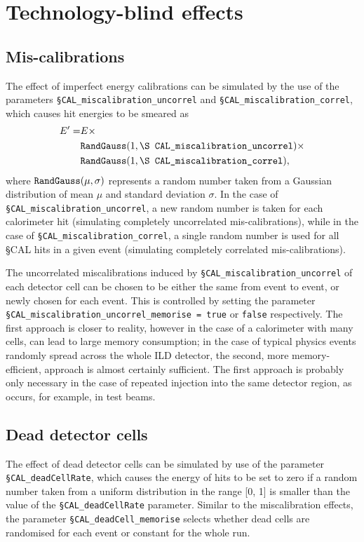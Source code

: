 \documentclass[12pt]{article} %
\begin{document}
\section{Technology-blind effects}
\label{sec:common}

\subsection{Mis-calibrations}
The effect of imperfect energy calibrations can be simulated by the use of the parameters
{\tt \S CAL\_miscalibration\_uncorrel} and {\tt \S CAL\_miscalibration\_correl}, which causes hit energies to
be smeared as 
\begin{equation*}
\begin{split}
E' = & E \times \\
& \text{\tt RandGauss} ( 1, \text{\tt \S CAL\_miscalibration\_uncorrel}) \times \\
& \text{\tt RandGauss} ( 1, \text{\tt \S CAL\_miscalibration\_correl}) ,
\end{split}
\end{equation*}
where $\text{\tt RandGauss} (\mu, \sigma)$ represents a random number taken from a Gaussian distribution of mean $\mu$ and 
standard deviation $\sigma$. In the case of {\tt \S CAL\_miscalibration\_uncorrel}, a new random number is taken for each 
calorimeter hit (simulating completely uncorrelated mis-calibrations), 
while in the case of {\tt \S CAL\_miscalibration\_correl}, a single random number is used for all \S CAL 
hits in a given event (simulating completely correlated mis-calibrations).

The uncorrelated miscalibrations induced by {\tt \S CAL\_miscalibration\_uncorrel} of each detector cell can be chosen to be either 
the same from event to event, or newly chosen for each event. 
This is controlled by setting the parameter {\tt \S CAL\_miscalibration\_uncorrel\_memorise = true} or {\tt false} respectively.
The first approach is closer to reality, however in the case of a calorimeter with many cells, can lead to large memory consumption;
in the case of typical physics events randomly spread across the whole ILD detector, the second, more memory-efficient, 
approach is almost certainly sufficient. The first approach is probably only necessary in the case of repeated injection into the same detector
region, as occurs, for example, in test beams.

\subsection{Dead detector cells}
The effect of dead detector cells can be simulated by use of the parameter {\tt \S CAL\_deadCellRate}, which causes the energy
of hits to be set to zero if a random number taken from a uniform distribution in the range [0, 1] is smaller than the 
value of the {\tt \S CAL\_deadCellRate} parameter.
Similar to the miscalibration effects, the parameter {\tt \S CAL\_deadCell\_memorise} selects whether dead cells are randomised for each event or constant for the whole run.
\end{document}
